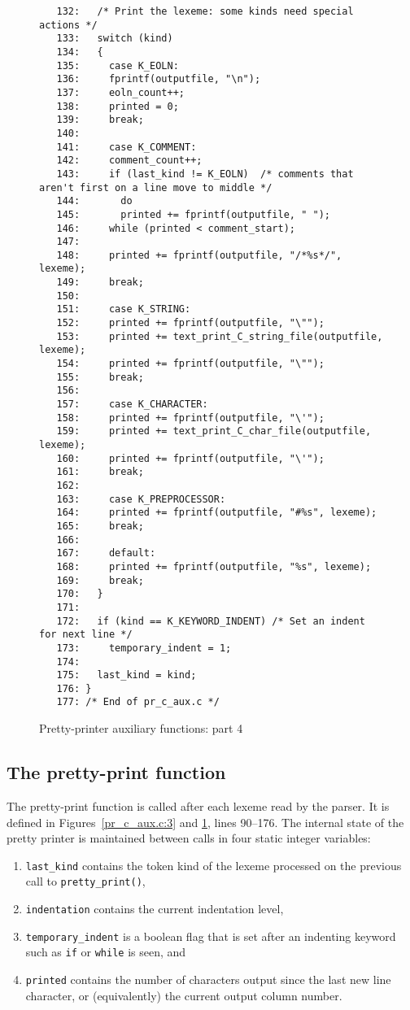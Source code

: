 \begin{figure}
\hspace*{-1.5cm}
\begin{minipage}{30cm}
\footnotesize
\begin{verbatim}
   132:   /* Print the lexeme: some kinds need special actions */
   133:   switch (kind)
   134:   {
   135:     case K_EOLN: 
   136:     fprintf(outputfile, "\n"); 
   137:     eoln_count++; 
   138:     printed = 0; 
   139:     break; 
   140:     
   141:     case K_COMMENT: 
   142:     comment_count++; 
   143:     if (last_kind != K_EOLN)  /* comments that aren't first on a line move to middle */
   144:       do
   145:       printed += fprintf(outputfile, " "); 
   146:     while (printed < comment_start); 
   147:       
   148:     printed += fprintf(outputfile, "/*%s*/", lexeme); 
   149:     break; 
   150:     
   151:     case K_STRING: 
   152:     printed += fprintf(outputfile, "\""); 
   153:     printed += text_print_C_string_file(outputfile, lexeme); 
   154:     printed += fprintf(outputfile, "\""); 
   155:     break; 
   156:     
   157:     case K_CHARACTER: 
   158:     printed += fprintf(outputfile, "\'"); 
   159:     printed += text_print_C_char_file(outputfile, lexeme); 
   160:     printed += fprintf(outputfile, "\'"); 
   161:     break; 
   162:     
   163:     case K_PREPROCESSOR: 
   164:     printed += fprintf(outputfile, "#%s", lexeme); 
   165:     break; 
   166:     
   167:     default: 
   168:     printed += fprintf(outputfile, "%s", lexeme); 
   169:     break; 
   170:   }
   171:   
   172:   if (kind == K_KEYWORD_INDENT) /* Set an indent for next line */
   173:     temporary_indent = 1; 
   174:   
   175:   last_kind = kind; 
   176: }
   177: /* End of pr_c_aux.c */
\end{verbatim}
\end{minipage}
\caption{Pretty-printer auxiliary functions: part 4}
\label{pr_c_aux.c:4}
\end{figure}

\subsection{The pretty-print function}
The pretty-print function is called after each lexeme read by the parser. It is defined in
Figures~\ref{pr_c_aux.c:3} and \ref{pr_c_aux.c:4}, lines 90--176. The internal state of
the pretty printer is maintained between calls in four static integer variables:
\begin{enumerate}
\item \verb+last_kind+ contains the token kind of the lexeme processed on the previous
call to \verb+pretty_print()+,
\item \verb+indentation+ contains the current indentation level,
\item \verb+temporary_indent+ is a boolean flag that is set after an indenting keyword
such as {\tt if} or {\tt while} is seen, and 
\item \verb+printed+ contains the number of characters output since the last new line character,
or (equivalently) the current output column number.
\end{enumerate}

